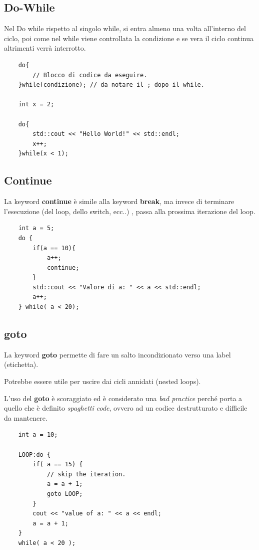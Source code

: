 \subsection{Do-While}

\textsf{\small Nel Do while rispetto al singolo while, si entra almeno una volta all'interno del ciclo, poi come nel while viene controllata la condizione e se vera il ciclo continua altrimenti verrà interrotto.} \\

\begin{lstlisting}
	do{
		// Blocco di codice da eseguire.
	}while(condizione); // da notare il ; dopo il while.

	int x = 2;
	
	do{
		std::cout << "Hello World!" << std::endl;
		x++;
	}while(x < 1);
\end{lstlisting}

\subsection{Continue}

\textsf{\small La keyword \textbf{continue} è simile alla keyword \textbf{break}, ma invece di terminare l'esecuzione (del loop, dello switch, ecc..) , passa alla prossima iterazione del loop.}\\

\begin{lstlisting}
	int a = 5;
	do {
		if(a == 10){
			a++;
			continue;
		}
		std::cout << "Valore di a: " << a << std::endl;
		a++;
	} while( a < 20);
\end{lstlisting}

\subsection{goto}

\textsf{\small La keyword \textbf{goto} permette di fare un salto incondizionato verso una label (etichetta).}

\textsf{\small Potrebbe essere utile per uscire dai cicli annidati (nested loops).}

\textsf{\small L'uso del \textbf{goto} è scoraggiato ed è considerato una \emph{bad practice} perché porta a quello che è definito \emph{spaghetti code}, ovvero ad un codice destrutturato e difficile da mantenere.} \\

\begin{lstlisting}
	int a = 10;
	
	LOOP:do {
		if( a == 15) {
			// skip the iteration.
			a = a + 1;
			goto LOOP;
		}
		cout << "value of a: " << a << endl;
		a = a + 1;
	} 
	while( a < 20 );
\end{lstlisting}

